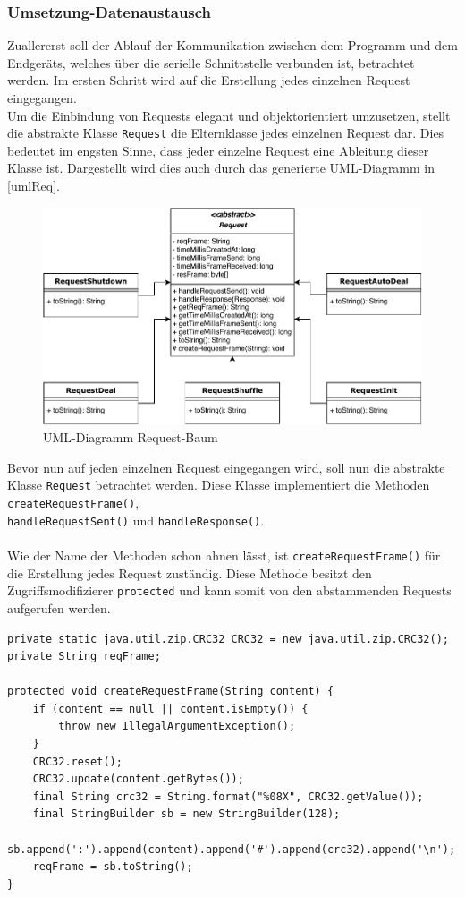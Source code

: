 \subsubsection{Umsetzung-Datenaustausch}
Zuallererst soll der Ablauf der Kommunikation zwischen dem Programm und dem Endgeräts, welches über die serielle Schnittstelle verbunden ist, betrachtet werden.
Im ersten Schritt wird auf die Erstellung jedes einzelnen Request eingegangen.\\
Um die Einbindung von Requests elegant und objektorientiert umzusetzen, stellt die abstrakte Klasse \lstinline[style=java]{Request} die Elternklasse jedes einzelnen Request dar.
Dies bedeutet im engsten Sinne, dass jeder einzelne Request eine Ableitung dieser Klasse ist.
Dargestellt wird dies auch durch das generierte UML-Diagramm in \autoref{umlReq}.
\begin{figure}[H]
\centering
\includegraphics[width=1\textwidth]{fig/ainf/AbstractRequestUML.pdf}
\caption{UML-Diagramm Request-Baum}
\label{umlReq}
\end{figure}
Bevor nun auf jeden einzelnen Request eingegangen wird, soll nun die abstrakte Klasse \lstinline[style=java]{Request} betrachtet werden.
Diese Klasse implementiert die Methoden \lstinline[style=java]{createRequestFrame()},\\ \lstinline[style=java]{handleRequestSent()} und \lstinline[style=java]{handleResponse()}.\\\\
Wie der Name der Methoden schon ahnen lässt, ist \lstinline[style=java]{createRequestFrame()} für die Erstellung jedes Request zuständig.
Diese Methode besitzt den Zugriffsmodifizierer \lstinline[style=java]{protected} und kann somit von den abstammenden Requests aufgerufen werden.
\begin{lstlisting}[style=java,caption=Methode createRequestFrame(),label=Gesamte Methode createRequestFrame()]
private static java.util.zip.CRC32 CRC32 = new java.util.zip.CRC32();
private String reqFrame;

protected void createRequestFrame(String content) {
    if (content == null || content.isEmpty()) {
        throw new IllegalArgumentException();
    }
    CRC32.reset();
    CRC32.update(content.getBytes());
    final String crc32 = String.format("%08X", CRC32.getValue());
    final StringBuilder sb = new StringBuilder(128);
    sb.append(':').append(content).append('#').append(crc32).append('\n');
    reqFrame = sb.toString();
}
\end{lstlisting}
